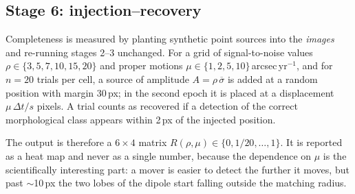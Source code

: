 \documentclass[11pt,a4paper]{article}
\begin{document}
\subsection{Stage 6: injection--recovery}
\label{sec:stage6}

Completeness is measured by planting synthetic point sources into the \emph{images} and re-running
stages 2--3 unchanged. For a grid of signal-to-noise values $\rho \in \{3,5,7,10,15,20\}$ and proper
motions $\mu \in \{1,2,5,10\}$\,arcsec\,yr$^{-1}$, and for $n=20$ trials per cell, a source of
amplitude $A = \rho\,\overline{\sigma}$ is added at a random position with margin 30\,px; in the
second epoch it is placed at a displacement $\mu\,\Delta t / s$ pixels. A trial counts as recovered if
a detection of the correct morphological class appears within 2\,px of the injected position.

The output is therefore a $6\times4$ matrix $R(\rho,\mu) \in \{0, 1/20, \dots, 1\}$. It is reported as
a heat map and never as a single number, because the dependence on $\mu$ is the scientifically
interesting part: a mover is easier to detect the further it moves, but past $\sim$10\,px the
two lobes of the dipole start falling outside the matching radius.
\end{document}
